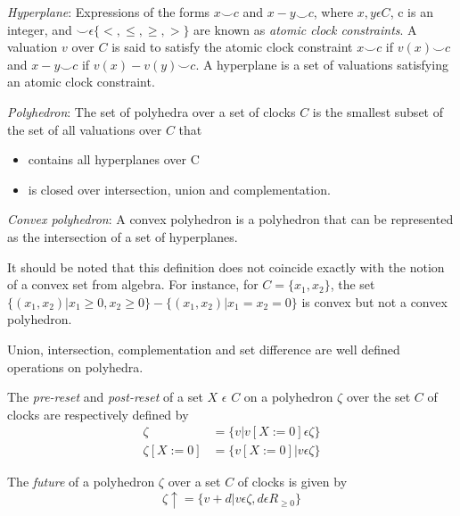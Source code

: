 \documentclass[a4paper]{llncs}
\begin{document}
\begin{definition}
\emph{Hyperplane}: Expressions of the forms $x \smile c$ and $x - y
\smile c$, where $x, y \epsilon C$, c is an integer, and $\smile
\epsilon \{ <, \leq, \geq, >\}$ are known as \emph{atomic clock
  constraints}. A valuation $v$ over $C$ is said to satisfy the
atomic clock constraint $x \smile c$ if $v(x) \smile c$ and $x - y
\smile c$ if $v(x) - v(y) \smile c$. A hyperplane is a set of
valuations satisfying an atomic clock constraint.
\end{definition}

\begin{definition}
\emph{Polyhedron}: The set of polyhedra over a set of clocks $C$ is
the smallest subset of the set of all valuations over $C$ that 
\begin{itemize}
\item contains all hyperplanes over C
\item is closed over intersection, union and complementation.
\end{itemize}
\end{definition}

\begin{definition}
\emph{Convex polyhedron}: A convex polyhedron is a polyhedron that can
be represented as the intersection of a set of hyperplanes.
\end{definition}

It should be noted that this definition does not coincide exactly with
the notion of a convex set from algebra. For instance, for
$C=\{x_1, x_2\}$, the set $\{(x_1, x_2)| x_1 \geq 0, x_2 \geq 0\} -
\{(x_1, x_2)| x_1 = x_2 = 0\}$ is convex but not a convex polyhedron.

Union, intersection, complementation and set difference are well
defined operations on polyhedra. 

The \emph{pre-reset} and \emph{post-reset} of a set $X$ $\epsilon$ $C$ on a
polyhedron $\zeta$ over the set $C$ of clocks are respectively defined
by
\begin{align*}
[X := 0]\zeta &= \{v| v[X := 0] \epsilon \zeta \} \\
\zeta[X := 0] &= \{v[X := 0]| v \epsilon \zeta \}
\end{align*}

The \emph{future} of a polyhedron $\zeta$ over a set $C$ of clocks
is given by 
\begin{displaymath}
\zeta \uparrow = \{v + d| v \epsilon \zeta, d \epsilon R_{\geq 0}\}
\end{displaymath}
\end{document}
